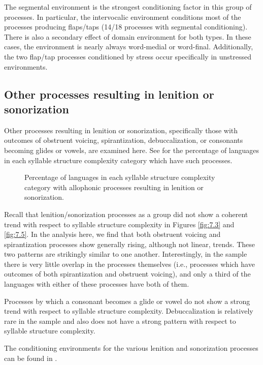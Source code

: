   The segmental environment is the strongest conditioning factor in this group of processes. In particular, the intervocalic environment conditions most of the processes producing flaps/taps (14/18 processes with segmental conditioning). There is also a secondary effect of domain environment for both types. In these cases, the environment is nearly always word-medial or word-final. Additionally, the two flap/tap processes conditioned by stress occur specifically in unstressed environments.

\subsection{Other processes resulting in lenition or sonorization}\label{sec:7.3.6}

  Other processes resulting in lenition or sonorization, specifically those with outcomes of obstruent voicing, spirantization, debuccalization, or consonants becoming glides or vowels, are examined here. See  for the percentage of languages in each syllable structure complexity category which have such processes.

\begin{figure}
\caption{\label{fig:7.10} Percentage of languages in each syllable structure complexity category with allophonic processes resulting in lenition or sonorization.}
\end{figure}
  Recall that lenition/sonorization processes as a group did not show a coherent trend with respect to syllable structure complexity in Figures \ref{fig:7.3} and \ref{fig:7.5}. In the analysis here, we find that both obstruent voicing and spirantization processes show generally rising, although not linear, trends. These two patterns are strikingly similar to one another. Interestingly, in the sample there is very little overlap in the processes themselves (i.e., processes which have outcomes of both spirantization and obstruent voicing), and only a third of the languages with either of these processes have both of them.

  Processes by which a consonant becomes a glide or vowel do not show a strong trend with respect to syllable structure complexity. Debuccalization is relatively rare in the sample and also does not have a strong pattern with respect to syllable structure complexity.

  The conditioning environments for the various lenition and sonorization processes can be found in .


